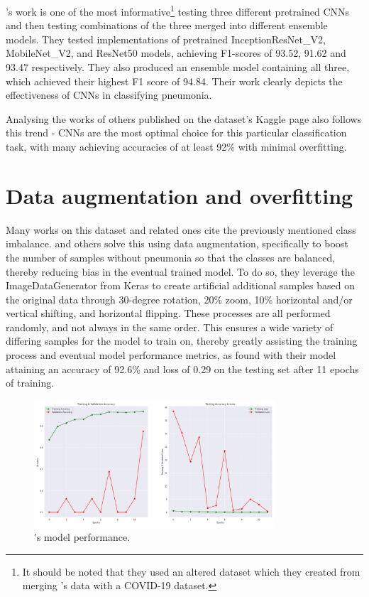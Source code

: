 \documentclass[12pt]{report}
\newcommand{\para}{\vspace{7pt}\noindent}
\begin{document}
\para \textcite{elasnaouiDesignEnsembleDeep2021a}'s work is one of the most informative\footnote{It should be noted that they used an altered dataset which they created from merging \textcite{kermanyIdentifyingMedicalDiagnoses2018}'s data with a COVID-19 dataset.}
testing three different pretrained CNNs and then testing combinations of the three merged into different ensemble models. 
They tested implementations of pretrained InceptionResNet\_V2, MobileNet\_V2, and ResNet50 models, achieving F1-scores of 93.52, 91.62 and 93.47 
respectively. They also produced an ensemble model containing all three, which achieved their highest F1 score of 94.84. Their work clearly 
depicts the effectiveness of CNNs in classifying pneumonia.

\para Analysing the works of others published on the dataset's Kaggle page also follows this trend - CNNs are the most optimal choice for this 
particular classification task, with many achieving accuracies of at least 92\% with minimal overfitting. 

\newpage

\section{Data augmentation and overfitting}\label{sec:Augmentation}
Many works on this dataset and related ones cite the previously mentioned class imbalance.
\textcite{mathurPneumoniaDetectionUsing2020} and others solve this using data augmentation, specifically to boost the number of samples without 
pneumonia so that the classes are balanced, thereby reducing bias in the eventual trained model.
To do so, they leverage the ImageDataGenerator from Keras to create artificial additional samples based on the original data through 
30-degree rotation, 20\% zoom, 10\% horizontal and/or vertical shifting, and horizontal flipping. These processes are all performed randomly,
and not always in the same order. This ensures a wide variety of differing samples for the model to train on, thereby greatly assisting 
the training process and eventual model performance metrics, as \textcite{mathurPneumoniaDetectionUsing2020} found with their model attaining 
an accuracy of 92.6\% and loss of 0.29 on the testing set after 11 epochs of training.

\begin{figure}[H]
    \centering
    \includegraphics[width=0.8\textwidth]{Proposal/MathurModelMetrics.png}
    \caption{\textcite{mathurPneumoniaDetectionUsing2020}'s model performance.\label{fig:MathurModelMetrics}}
\end{figure}
\end{document}
